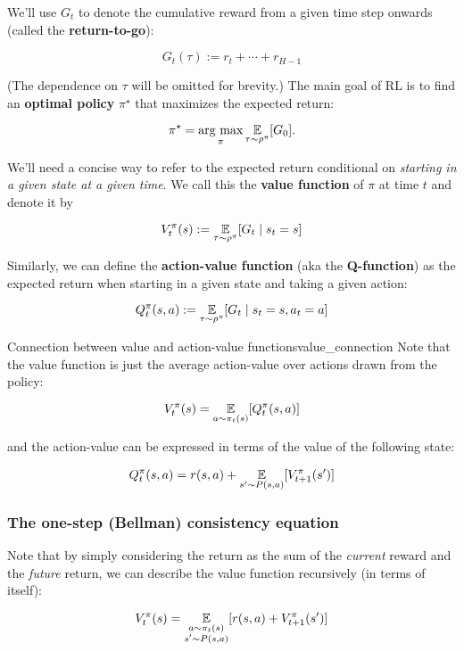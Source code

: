 \documentclass[../main/main]{subfiles}
\begin{document}
We'll use $G_t$ to denote the cumulative reward from a given time step onwards (called the \textbf{return-to-go}):

\[
    G_t(\tau) := r_t + \cdots + r_{H-1}
\]

(The dependence on $\tau$ will be omitted for brevity.) The main goal of RL is to find an \textbf{optimal policy} $\pi^\star$ that maximizes the expected return:

\[
    \pi^{\star} = \operatorname*{\textrm{arg\ max}}_{\pi} \operatorname*{\mathbb{E}}_{\tau \sim \rho^\pi} [G_0].
\]

We'll need a concise way to refer to the expected return conditional on \emph{starting in a given state at a given time}. We call this the \textbf{value function} of $\pi$ at time $t$ and denote it by

\[
    V_t^\pi(s) := \operatorname*{\mathbb{E}}_{\tau \sim \rho^\pi} [G_t \mid s_t = s]
\]


Similarly, we can define the \textbf{action-value function} (aka the \textbf{Q-function}) as the expected return when starting in a given state and taking a given action:

\[
    Q_t^\pi(s, a) := \operatorname*{\mathbb{E}}_{\tau \sim \rho^\pi} [G_t \mid s_t = s, a_t = a]
\]

\begin{remark}{Connection between value and action-value functions}{value_connection}
    Note that the value function is just the average action-value over actions drawn from the policy:

    \[
        V_t^\pi(s) = \operatorname*{\mathbb{E}}_{a \sim \pi_t(s)} [Q_t^\pi(s, a)]
    \]

    and the action-value can be expressed in terms of the value of the following state:

    \[
        Q_t^\pi(s, a) = r(s, a) + \operatorname*{\mathbb{E}}_{s' \sim P(s, a)} [V_{t+1}^\pi(s')]
    \]
\end{remark}

\subsubsection{The one-step (Bellman) consistency equation}

Note that by simply considering the return as the sum of the \emph{current} reward and the \emph{future} return, we can describe the value function recursively (in terms of itself):

\begin{equation}
    V_t^\pi(s) = \operatorname*{\mathbb{E}}_{\substack{a \sim \pi_t(s) \\ s' \sim P(s, a)}} [r(s, a) + V_{t+1}^\pi(s')]
\end{equation}
\end{document}
